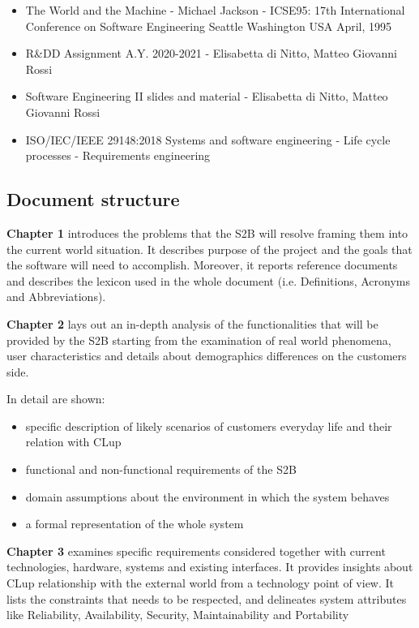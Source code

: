 \begin{itemize}
      \item The World and the Machine - Michael Jackson - ICSE95: 17th International Conference on Software Engineering Seattle Washington USA April, 1995
      \item R\&DD Assignment A.Y. 2020-2021 - Elisabetta di Nitto, Matteo Giovanni Rossi
      \item Software Engineering II slides and material - Elisabetta di Nitto, Matteo Giovanni Rossi
      \item ISO/IEC/IEEE 29148:2018 Systems and software engineering - Life cycle processes - Requirements engineering
\end{itemize}

\subsection{Document structure}

\textbf{Chapter 1} introduces the problems that the S2B will resolve framing them into the current world situation. It describes purpose of the project and the goals that the software will need to accomplish. Moreover, it reports reference documents and describes the lexicon used in the whole document (i.e. Definitions, Acronyms and Abbreviations).

\textbf{Chapter 2} lays out an in-depth analysis of the functionalities that will be provided by the S2B starting from the examination of real world phenomena, user characteristics and details about demographics differences on the customers side.

In detail are shown:
\begin{itemize}
      \item specific description of likely scenarios of customers everyday life and their relation with CLup
      \item functional and non-functional requirements of the S2B
      \item domain assumptions about the environment in which the system behaves
      \item a formal representation of the whole system
\end{itemize}

\textbf{Chapter 3} examines specific requirements considered together with current technologies, hardware, systems and existing interfaces. It provides insights about CLup relationship with the external world from a technology point of view. It lists the constraints that needs to be respected, and delineates system attributes like Reliability, Availability, Security, Maintainability and Portability

